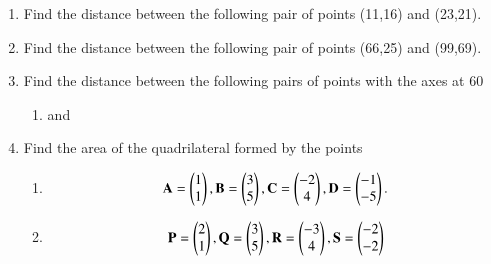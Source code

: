 \renewcommand{\theequation}{\theenumi}
\renewcommand{\thefigure}{\theenumi}
\begin{enumerate}[label=\thesubsection.\arabic*.,ref=\thesubsection.\theenumi]

\item Find the distance between the following pair of points
(11,16) and (23,21).\\


\item Find the distance between the following pair of points
(66,25) and (99,69).
\\

%
\item Find the distance between the following pairs of points  with the axes at 60\degree
\begin{enumerate}
    \item {} and 
\end{enumerate}
\item Find the area of the quadrilateral formed by the points
\begin{enumerate}
\item 
\begin{align}
\begin{split}
\mathbf{A} = \begin{pmatrix}1 \\ 1\end{pmatrix}, 
\mathbf{B} = \begin{pmatrix}3 \\ 5\end{pmatrix}, 
\mathbf{C} = \begin{pmatrix}-2 \\ 4\end{pmatrix}, 
\mathbf{D} = \begin{pmatrix}-1 \\ -5\end{pmatrix}.
\end{split}
\end{align}
\solution

\item 
\begin{align}
\mathbf{P} = \begin{pmatrix}2\\1\end{pmatrix}, \mathbf{Q} =\begin{pmatrix}3\\5\end{pmatrix},
\mathbf{R} =\begin{pmatrix}-3\\4\end{pmatrix}, \mathbf{S} =\begin{pmatrix}-2\\-2\end{pmatrix}
\end{align}
\solution


\end{enumerate}
\end{enumerate}
